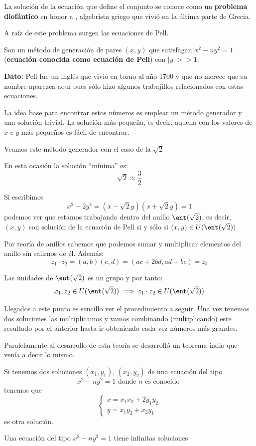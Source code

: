 \documentclass{apuntes}
\begin{document}
La solución de la ecuación que define el conjunto se conoce como un \textbf{problema diofántico} en honor a , algebrista griego que vivió en la última parte de Grecia.

A raíz de este problema surgen las ecuaciones de Pell.

\begin{defn}
Son un método de generación de pares $(x,y)$ que satisfagan $x^2-ny^2=1$ (\textbf{ecuación conocida como ecuación de Pell}) con $|y|>>1$.

\textbf{Dato:} Pell fue un inglés que vivió en torno al año 1700 y que no merece que su nombre aparezca aquí pues sólo hizo algunos trabajillos relacionados con estas ecuaciones.
\end{defn}

La idea base para encontrar estos números es emplear un método generador y una solución trivial. La solución más pequeña, es decir, aquella con los valores de $x$ e $y$ más pequeños es fácil de encontrar.

Veamos este método generador con el caso de la $\sqrt{2}$
\begin{example}
En esta ocasión la solución ``mínima'' es:
\[\sqrt{2} \approx \frac{3}{2}\]

Si escribimos
\[x^2-2y^2 = (x-\sqrt{2}y)(x+\sqrt{2}y) = 1\]
podemos ver que estamos trabajando dentro del anillo $\ent(\sqrt{2})$, es decir, $(x,y)$ son solución de la ecuación de Pell si y sólo si $(x,y)\in U(\ent(\sqrt{2}))$

\obs Por teoría de anillos sabemos que podemos sumar y multiplicar elementos del anillo sin salirnos de él. Además:
\[z_1\cdot z_2 = (a,b)(c,d) = (ac+2bd,ad+bc) = z_3\]

\begin{prop}
Las unidades de $\ent(\sqrt{2})$ es un grupo y por tanto:
\[x_1,z_2 \in U(\ent(\sqrt{2})) \implies z_1\cdot z_2 \in U(\ent(\sqrt{2}))\]
\end{prop}

Llegados a este punto es sencillo ver el procedimiento a seguir. Una vez tenemos dos soluciones las multiplicamos y vamos combinando (multiplicando) este resultado por el anterior hasta ir obteniendo cada vez números más grandes.
\end{example}

Paralelamente al desarrollo de esta teoría se desarrolló un teorema indio que venía a decir lo mismo.

\begin{theorem}
Si tenemos dos soluciones $(x_1,y_1)$, $(x_2,y_2)$ de una ecuación del tipo
\[x^2-ny^2=1 \text{ donde } n \text{ es conocido }\]
tenemos que
\[\left\{ \begin{array}{l} x= x_1x_2+2y_1y_2 \\ y=x_1y_2+x_2y_1 \end{array}\right.\]
es otra solución.
\end{theorem}
\begin{corol}
Una ecuación del tipo $x^2-ny^2=1$ tiene infinitas soluciones
\end{corol}
\end{document}
